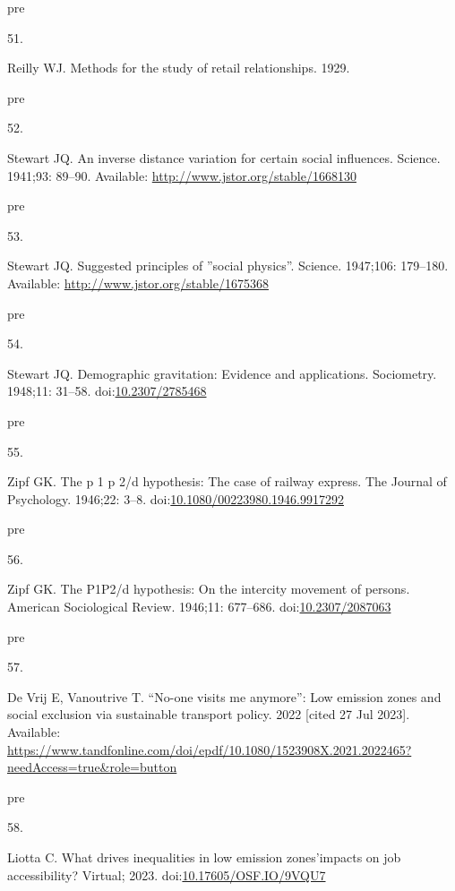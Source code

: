 \documentclass[10pt,letterpaper]{article}
\newlength{\cslhangindent}
\newlength{\csllabelwidth}
\newlength{\cslentryspacingunit} %
\newenvironment{CSLReferences}[2] %
 {%
  \setlength{\parindent}{0pt}
  \ifodd #1
  \let\oldpar\par
  \def\par{\hangindent=\cslhangindent\oldpar}
  \fi
  \setlength{\parskip}{#2\cslentryspacingunit}
 }%
 {}
\newcommand{\CSLLeftMargin}[1]{\parbox[t]{\csllabelwidth}{#1}}
\newcommand{\CSLRightInline}[1]{\parbox[t]{\linewidth - \csllabelwidth}{#1}\break}
\providecommand{\DIFaddtex}[1]{{\protect\color{blue}\uwave{#1}}} %
\providecommand{\DIFaddend}{} %
\providecommand{\DIFadd}[1]{\texorpdfstring{\DIFaddtex{#1}}{#1}} %
\DeclareRobustCommand{\DIFaddend}{\DIFOaddend \let\includegraphics\DIFOincludegraphics} %
\begin{document}
\begin{CSLReferences}{0}{0}
\leavevmode\vadjust \DIFadd{pre}{\hypertarget{ref-reillyMethods1929}{}}%
\CSLLeftMargin{51. }%
\CSLRightInline{Reilly WJ. Methods for the study of retail
relationships. 1929. }

\leavevmode\vadjust \DIFadd{pre}{\hypertarget{ref-stewartInverse1941}{}}%
\CSLLeftMargin{52. }%
\CSLRightInline{Stewart JQ. An inverse distance variation for certain
social influences. Science. 1941;93: 89--90. Available:
\url{http://www.jstor.org/stable/1668130}}

\leavevmode\vadjust \DIFadd{pre}{\hypertarget{ref-stewartSuggested1947}{}}%
\CSLLeftMargin{53. }%
\CSLRightInline{Stewart JQ. Suggested principles of ''social physics''.
Science. 1947;106: 179--180. Available:
\url{http://www.jstor.org/stable/1675368}}

\leavevmode\vadjust \DIFadd{pre}{\hypertarget{ref-stewartDemographic1948}{}}%
\CSLLeftMargin{54. }%
\CSLRightInline{Stewart JQ. Demographic gravitation: Evidence and
applications. Sociometry. 1948;11: 31--58.
doi:\href{https://doi.org/10.2307/2785468}{10.2307/2785468}}

\leavevmode\vadjust \DIFadd{pre}{\hypertarget{ref-zipfHypothesis1946}{}}%
\CSLLeftMargin{55. }%
\CSLRightInline{Zipf GK. The p 1 p 2/d hypothesis: The case of railway
express. The Journal of Psychology. 1946;22: 3--8.
doi:\href{https://doi.org/10.1080/00223980.1946.9917292}{10.1080/00223980.1946.9917292}}

\leavevmode\vadjust \DIFadd{pre}{\hypertarget{ref-zipfIntercity1946}{}}%
\CSLLeftMargin{56. }%
\CSLRightInline{Zipf GK. The P1P2/d hypothesis: On the intercity
movement of persons. American Sociological Review. 1946;11: 677--686.
doi:\href{https://doi.org/10.2307/2087063}{10.2307/2087063}}

\leavevmode\vadjust \DIFadd{pre}{\hypertarget{ref-devrijNooneVisitsMe2022}{}}%
\CSLLeftMargin{57. }%
\CSLRightInline{De Vrij E, Vanoutrive T. {``No-one visits me anymore''}:
Low emission zones and social exclusion via sustainable transport
policy. 2022 {[}cited 27 Jul 2023{]}. Available:
\url{https://www.tandfonline.com/doi/epdf/10.1080/1523908X.2021.2022465?needAccess=true\&role=button}}

\leavevmode\vadjust \DIFadd{pre}{\hypertarget{ref-liottaWhatDrivesInequalities2023}{}}%
\CSLLeftMargin{58. }%
\CSLRightInline{Liotta C. What drives inequalities in low emission
zones'impacts on job accessibility? Virtual; 2023.
doi:\href{https://doi.org/10.17605/OSF.IO/9VQU7}{10.17605/OSF.IO/9VQU7}}
\DIFaddend 

\end{CSLReferences}

\nolinenumbers
\end{document}
